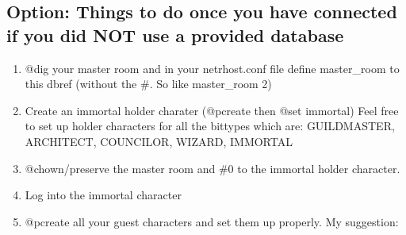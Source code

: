 \documentclass[letterpaper,10pt,english]{sphinxmanual}
\begin{document}
\subsection{Option: Things to do once you have connected if you did NOT use a provided database}
\label{\detokenize{install:option-things-to-do-once-you-have-connected-if-you-did-not-use-a-provided-database}}\begin{enumerate}
%
\item {} 
\sphinxAtStartPar
@dig your master room and in your netrhost.conf file define master\_room to this dbref (without the \#.  So like master\_room 2)

\item {} 
\sphinxAtStartPar
Create an immortal holder charater (@pcreate then @set immortal) Feel free to set up holder characters for all the bittypes which are: GUILDMASTER, ARCHITECT, COUNCILOR, WIZARD, IMMORTAL

\item {} 
\sphinxAtStartPar
@chown/preserve the master room and \#0 to the immortal holder character.

\item {} 
\sphinxAtStartPar
Log into the immortal character

\item {} 
\sphinxAtStartPar
@pcreate all your guest characters and set them up properly.  My suggestion:

\begin{sphinxVerbatim}[commandchars=\\\{\}]
  
\end{sphinxVerbatim}

\end{enumerate}
\end{document}
